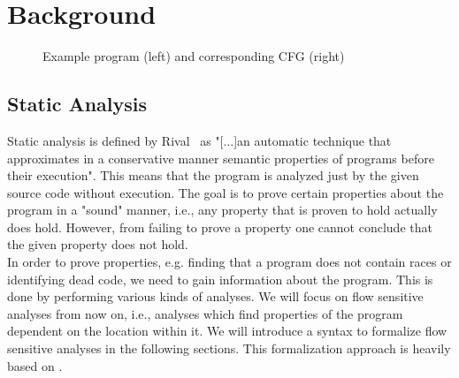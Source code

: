 
\chapter{Background}\label{chapter:background}

\begin{figure}
  \centering
  \begin{subfigure}{.35\textwidth}
    \centering
    
  \end{subfigure}
  \begin{subfigure}{.35\textwidth}
    \centering
  \end{subfigure}
  \caption{Example program (left) and corresponding CFG (right)}
  \label{fig:example_cfg}
\end{figure}

  \section{Static Analysis}
    Static analysis is defined by Rival~\parencite{rival2020introduction} as "[...]an automatic technique that approximates in a conservative manner semantic properties of programs before their execution". This means that the program is analyzed just by the given source code without execution. The goal is to prove certain properties about the program in a "sound" manner, i.e., any property that is proven to hold actually does hold. However, from failing to prove a property one cannot conclude that the given property does not hold.\\
    In order to prove properties, e.g. finding that a program does not contain races or identifying dead code, we need to gain information about the program. This is done by performing various kinds of analyses. We will focus on flow sensitive analyses from now on, i.e., analyses which find properties of the program dependent on the location within it. We will introduce a syntax to formalize flow sensitive analyses in the following sections. This formalization approach is heavily based on \parencite{apinis2012side}.
    
